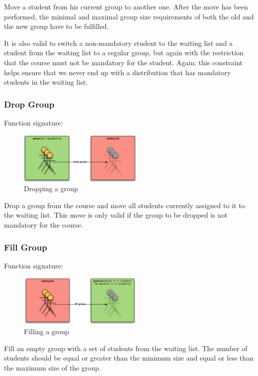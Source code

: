 Move a student from his current group to another one. After the move has been performed, the minimal and maximal group size requirements of both the old and the new group have to be fulfilled.

It is also valid to switch a non-mandatory student to the waiting list and a student from the waiting list to a regular group, but again with the restriction that the course must not be mandatory for the student. Again: this constraint helps ensure that we never end up with a distribution that has mandatory students in the waiting list.

\subsubsection{Drop Group}
Function signature:
\begin{figure}[H]
	\caption{Dropping a group}
	\label{fig:moves_drop}
	\centering
	\includegraphics[width=6cm]{img/drop}
\end{figure}

Drop a group from the course and move all students currently assigned to it to the waiting list. This move is only valid if the group to be dropped is not mandatory for the course.

\subsubsection{Fill Group}
Function signature:
\begin{figure}[H]
	\caption{Filling a group}
	\label{fig:moves_fill}
	\centering
	\includegraphics[width=6cm]{img/fill}
\end{figure}

Fill an empty group with a set of students from the waiting list. The number of students should be equal or greater than the minimum size and equal or less than the maximum size of the group.

